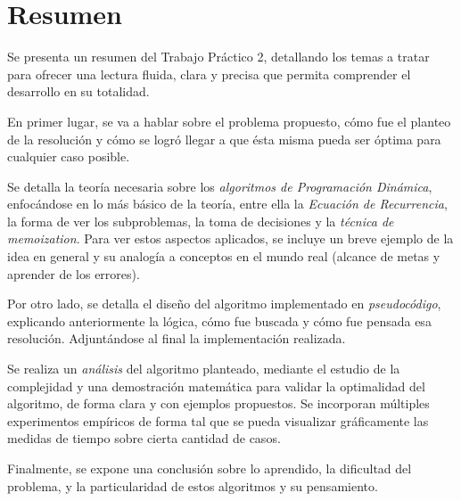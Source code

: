 \vspace*{1.5cm}
\section{Resumen}

Se presenta un resumen del Trabajo Práctico 2, detallando los temas a tratar para ofrecer una lectura fluida, clara y precisa que permita comprender el desarrollo en su totalidad.

En primer lugar, se va a hablar sobre el problema propuesto, cómo fue el planteo de la resolución y cómo se logró llegar a que ésta misma pueda ser óptima para cualquier caso posible.

Se detalla la teoría necesaria sobre los \textit{algoritmos de Programación Dinámica}, enfocándose en lo más básico de la teoría, entre ella la \textit{Ecuación de Recurrencia}, la forma de ver los subproblemas, la toma de decisiones y la \textit{técnica de memoization}. Para ver estos aspectos aplicados, se incluye un breve ejemplo de la idea en general y su analogía a conceptos en el mundo real (alcance de metas y aprender de los errores).

Por otro lado, se detalla el diseño del algoritmo implementado en \textit{pseudocódigo}, explicando anteriormente la lógica, cómo fue buscada y cómo fue pensada esa resolución. Adjuntándose al final la implementación realizada.

Se realiza un \textit{análisis} del algoritmo planteado, mediante el estudio de la complejidad y una demostración matemática para validar la optimalidad del algoritmo, de forma clara y con ejemplos propuestos. Se incorporan múltiples experimentos empíricos de forma tal que se pueda visualizar gráficamente las medidas de tiempo sobre cierta cantidad de casos.

Finalmente, se expone una conclusión sobre lo aprendido, la dificultad del problema, y la particularidad de estos algoritmos y su pensamiento.
